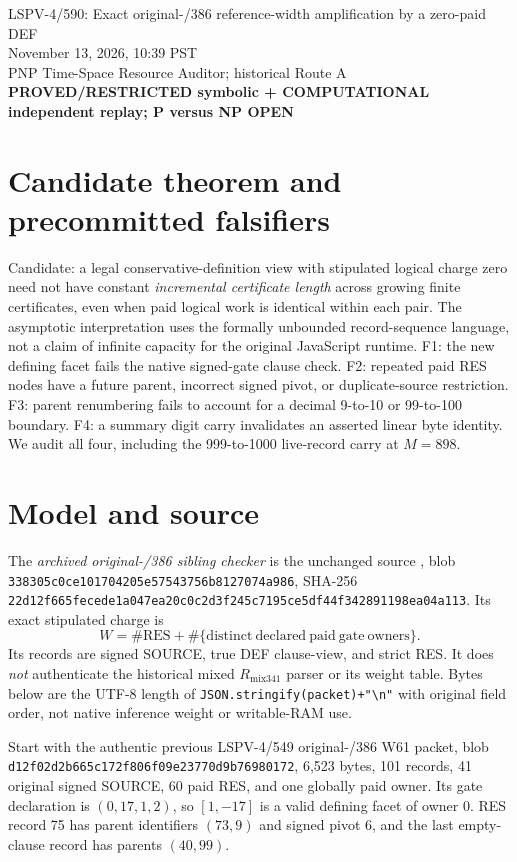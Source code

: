 \documentclass[11pt]{article}
\begin{document}
\begin{center}
{\Large LSPV-4/590: Exact original-/386 reference-width amplification by a zero-paid DEF}\\
November 13, 2026, 10:39 PST\\
PNP Time-Space Resource Auditor; historical Route A\\
\textbf{PROVED/RESTRICTED symbolic + COMPUTATIONAL independent replay; P versus NP OPEN}
\end{center}

\section*{Candidate theorem and precommitted falsifiers}
Candidate: a legal conservative-definition view with stipulated logical charge zero need not have constant \emph{incremental certificate length} across growing finite certificates, even when paid logical work is identical within each pair. The asymptotic interpretation uses the formally unbounded record-sequence language, not a claim of infinite capacity for the original JavaScript runtime. F1: the new defining facet fails the native signed-gate clause check. F2: repeated paid RES nodes have a future parent, incorrect signed pivot, or duplicate-source restriction. F3: parent renumbering fails to account for a decimal 9-to-10 or 99-to-100 boundary. F4: a summary digit carry invalidates an asserted linear byte identity. We audit all four, including the 999-to-1000 live-record carry at $M=898$.

\section*{Model and source}
The \emph{archived original-/386 sibling checker} is the unchanged source , blob \texttt{338305c0ce101704205e57543756b8127074a986}, SHA-256 \texttt{22d12f665fecede1a047ea20c0c2d3f245c7195ce5df44f342891198ea04a113}. Its exact stipulated charge is
\[
W=\#\mathrm{RES}+\#\{\mathrm{distinct\ declared\ paid\ gate\ owners}\}.
\]
Its records are signed SOURCE, true DEF clause-view, and strict RES. It does \emph{not} authenticate the historical mixed $R_{\mathrm{mix341}}$ parser or its weight table. Bytes below are the UTF-8 length of \texttt{JSON.stringify(packet)+"\textbackslash n"} with original field order, not native inference weight or writable-RAM use.

Start with the authentic previous LSPV-4/549 original-/386 W61 packet, blob \texttt{d12f02d2b665c172f806f09e23770d9b76980172}, 6,523 bytes, 101 records, 41 original signed SOURCE, 60 paid RES, and one globally paid owner. Its gate declaration is $(0,17,1,2)$, so $[1,-17]$ is a valid defining facet of owner 0. RES record 75 has parent identifiers $(73,9)$ and signed pivot 6, and the last empty-clause record has parents $(40,99)$.
\end{document}
